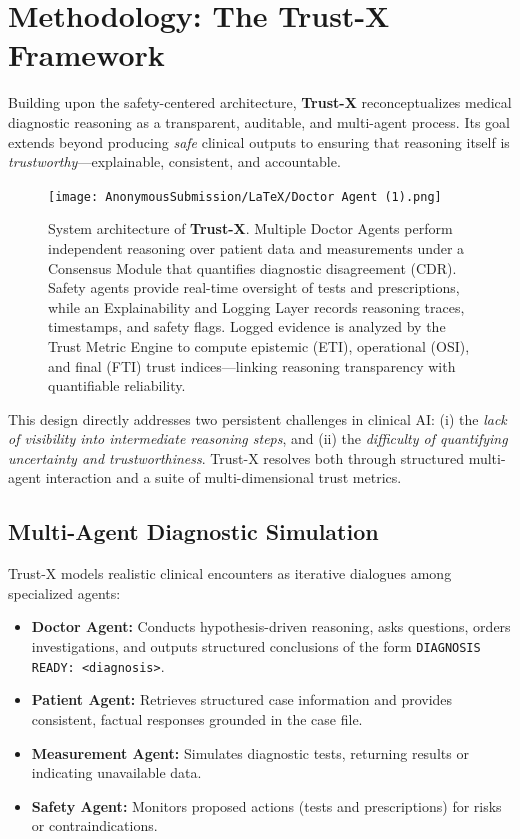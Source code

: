 \documentclass[letterpaper]{article} %
\begin{document}
\section{Methodology: The Trust-X Framework}

Building upon the safety-centered architecture, \textbf{Trust-X} reconceptualizes medical diagnostic reasoning as a transparent, auditable, and multi-agent process. Its goal extends beyond producing \textit{safe} clinical outputs to ensuring that reasoning itself is \textit{trustworthy}—explainable, consistent, and accountable.

\begin{figure}[t]
\centering
\texttt{[image: AnonymousSubmission/LaTeX/Doctor Agent (1).png]}
\caption{
System architecture of \textbf{Trust-X}. Multiple Doctor Agents perform independent reasoning over patient data and measurements under a Consensus Module that quantifies diagnostic disagreement (CDR). Safety agents provide real-time oversight of tests and prescriptions, while an Explainability and Logging Layer records reasoning traces, timestamps, and safety flags. Logged evidence is analyzed by the Trust Metric Engine to compute epistemic (ETI), operational (OSI), and final (FTI) trust indices—linking reasoning transparency with quantifiable reliability.
}
\label{fig:logging-architecture}
\end{figure}

This design directly addresses two persistent challenges in clinical AI: (i) the \textit{lack of visibility into intermediate reasoning steps}, and (ii) the \textit{difficulty of quantifying uncertainty and trustworthiness}. Trust-X resolves both through structured multi-agent interaction and a suite of multi-dimensional trust metrics.

\subsection{Multi-Agent Diagnostic Simulation}

Trust-X models realistic clinical encounters as iterative dialogues among specialized agents:

\begin{itemize}
    \item \textbf{Doctor Agent:} Conducts hypothesis-driven reasoning, asks questions, orders investigations, and outputs structured conclusions of the form \texttt{DIAGNOSIS READY: <diagnosis>}.
    \item \textbf{Patient Agent:} Retrieves structured case information and provides consistent, factual responses grounded in the case file.
    \item \textbf{Measurement Agent:} Simulates diagnostic tests, returning results or indicating unavailable data.
    \item \textbf{Safety Agent:} Monitors proposed actions (tests and prescriptions) for risks or contraindications.
\end{itemize}
\end{document}

